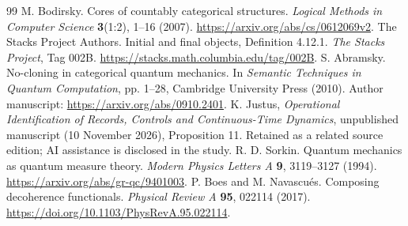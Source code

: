 \documentclass[11pt,a4paper]{article}
\begin{document}
\begin{thebibliography}{99}
M. Bodirsky. Cores of countably categorical structures.
\emph{Logical Methods in Computer Science} \textbf{3}(1:2), 1--16 (2007).
\url{https://arxiv.org/abs/cs/0612069v2}.
The Stacks Project Authors. Initial and final objects, Definition 4.12.1.
\emph{The Stacks Project}, Tag 002B.
\url{https://stacks.math.columbia.edu/tag/002B}.
S. Abramsky. No-cloning in categorical quantum mechanics.
In \emph{Semantic Techniques in Quantum Computation}, pp. 1--28,
Cambridge University Press (2010).
Author manuscript: \url{https://arxiv.org/abs/0910.2401}.
 K. Justus, \emph{Operational Identification of Records, Controls and Continuous-Time Dynamics}, unpublished manuscript (10 November 2026), Proposition 11. Retained as a related source edition; AI assistance is disclosed in the study.
R. D. Sorkin. Quantum mechanics as quantum measure theory.
\emph{Modern Physics Letters A} \textbf{9}, 3119--3127 (1994).
\url{https://arxiv.org/abs/gr-qc/9401003}.
P. Boes and M. Navascu\'es. Composing decoherence functionals.
\emph{Physical Review A} \textbf{95}, 022114 (2017).
\url{https://doi.org/10.1103/PhysRevA.95.022114}.
\end{thebibliography}
\end{document}
